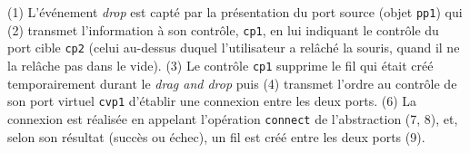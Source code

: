 (1) L'événement \emph{drop} est capté par la présentation du port
source (objet \verb!pp1!) qui (2) transmet l'information à son
contrôle, \verb!cp1!, en lui indiquant le contrôle du port cible
\verb!cp2! (celui au-dessus duquel l'utilisateur a relâché la
souris, quand il ne la relâche pas dans le vide). (3) Le contrôle
\verb!cp1! supprime le fil qui était créé temporairement durant le
\emph{drag and drop} puis (4) transmet l'ordre au contrôle de son port
virtuel \verb!cvp1! d'établir une connexion entre les deux ports.
(6) La connexion est réalisée en appelant l'opération \verb!connect! de
l'abstraction (7, 8), et, selon son résultat (succès ou échec), un fil est
créé entre les deux ports (9).